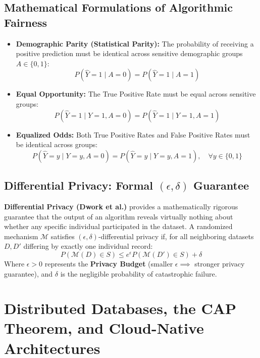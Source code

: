 \subsection{Mathematical Formulations of Algorithmic Fairness}
\begin{itemize}
    \item \textbf{Demographic Parity (Statistical Parity):} The probability of receiving a positive prediction must be identical across sensitive demographic groups $A \in \{0, 1\}$:
    \begin{equation}
    P(\hat{Y} = 1 \mid A = 0) = P(\hat{Y} = 1 \mid A = 1)
    \end{equation}
    \item \textbf{Equal Opportunity:} The True Positive Rate must be equal across sensitive groups:
    \begin{equation}
    P(\hat{Y} = 1 \mid Y = 1, A = 0) = P(\hat{Y} = 1 \mid Y = 1, A = 1)
    \end{equation}
    \item \textbf{Equalized Odds:} Both True Positive Rates and False Positive Rates must be identical across groups:
    \begin{equation}
    P(\hat{Y} = y \mid Y = y, A = 0) = P(\hat{Y} = y \mid Y = y, A = 1), \quad \forall y \in \{0, 1\}
    \end{equation}
\end{itemize}

\subsection{Differential Privacy: Formal $(\epsilon, \delta)$ Guarantee}
\textbf{Differential Privacy (Dwork et al.)} provides a mathematically rigorous guarantee that the output of an algorithm reveals virtually nothing about whether any specific individual participated in the dataset. A randomized mechanism $\mathcal{M}$ satisfies $(\epsilon, \delta)$-differential privacy if, for all neighboring datasets $D, D'$ differing by exactly one individual record:
\begin{equation}
\label{eq:differential_privacy}
P(\mathcal{M}(D) \in S) \le e^{\epsilon} P(\mathcal{M}(D') \in S) + \delta
\end{equation}
Where $\epsilon > 0$ represents the \textbf{Privacy Budget} (smaller $\epsilon \implies$ stronger privacy guarantee), and $\delta$ is the negligible probability of catastrophic failure.


\section{Distributed Databases, the CAP Theorem, and Cloud-Native Architectures}
\label{sec:distributed_databases_cap}

